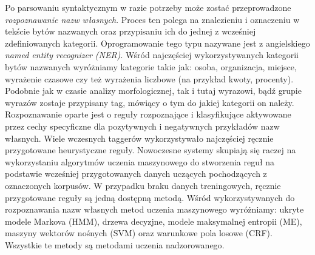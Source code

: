 \documentclass[a4paper, twoside, 12pt]{report}
\begin{document}
            Po parsowaniu syntaktycznym w razie potrzeby może zostać przeprowadzone \emph{rozpoznawanie nazw własnych}. Proces
            ten polega na znalezieniu i oznaczeniu w tekście bytów nazwanych oraz przypisaniu ich do jednej z wcześniej
            zdefiniowanych kategorii. Oprogramowanie tego typu nazywane jest z angielskiego \emph{named entity recognizer (NER)}.
            Wśród najczęściej wykorzystywanych kategorii bytów nazwanych wyróżniamy kategorie
            takie jak: osoba, organizacja, miejsce, wyrażenie czasowe czy też wyrażenia liczbowe (na przykład kwoty, procenty).
            Podobnie jak w czasie analizy morfologicznej, tak i tutaj wyrazowi, bądź grupie wyrazów zostaje przypisany
            tag, mówiący o tym do jakiej kategorii on należy. Rozpoznawanie oparte jest o reguły rozpoznające i klasyfikujące
            aktywowane przez cechy specyficzne dla pozytywnych i negatywnych przykładów nazw własnych. Wiele wczesnych
            taggerów wykorzystywało najczęściej ręcznie przygotowane heurystyczne reguły. Nowoczesne systemy skupiają się
            raczej na wykorzystaniu algorytmów uczenia maszynowego do stworzenia reguł na podstawie wcześniej przygotowanych
            danych uczących pochodzących z oznaczonych korpusów. W przypadku braku danych treningowych, ręcznie przygotowane
            reguły są jedną dostępną metodą. Wśród wykorzystywanych do rozpoznawania nazw własnych metod uczenia maszynowego
            wyróżniamy: ukryte modele Markova (HMM), drzewa decyzjne, modele maksymalnej entropii (ME), maszyny wektorów nośnych (SVM)
            oraz warunkowe pola losowe (CRF). Wszystkie te metody są metodami uczenia nadzorowanego\cite{NERSURVEY}.
\end{document}
